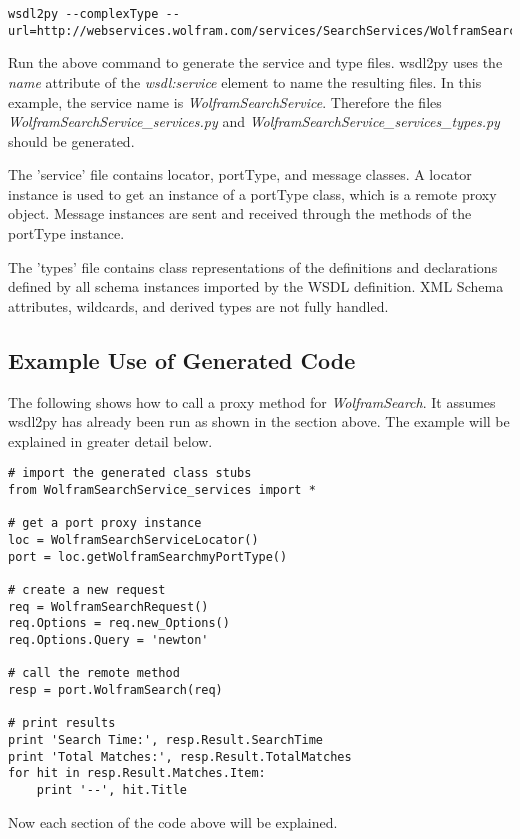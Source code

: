 \begin{verbatim}
wsdl2py --complexType --url=http://webservices.wolfram.com/services/SearchServices/WolframSearch2.wsdl
\end{verbatim}

Run the above command to generate the service and type files.  wsdl2py uses
the {\it name} attribute of the {\it wsdl:service} element to name the resulting files.
In this example, the service name is {\it WolframSearchService}.  Therefore the files
{\it WolframSearchService_services.py} and {\it WolframSearchService_services_types.py}
should be generated.

The 'service' file contains locator, portType, and message classes.  
A locator instance is used to get an instance of a portType class, 
which is a remote proxy object. Message instances are sent and received 
through the methods of the portType instance.

The 'types' file contains class representations of the definitions and
declarations defined by all schema instances imported by the WSDL definition.
XML Schema attributes, wildcards, and derived types are not fully
handled.

\subsection{Example Use of Generated Code}

The following shows how to call a proxy method for {\it WolframSearch}.  It
assumes wsdl2py has already been run as shown in the section above.  The example
will be explained in greater detail below.

\begin{verbatim}
# import the generated class stubs
from WolframSearchService_services import *

# get a port proxy instance
loc = WolframSearchServiceLocator()
port = loc.getWolframSearchmyPortType()

# create a new request
req = WolframSearchRequest()
req.Options = req.new_Options()
req.Options.Query = 'newton'

# call the remote method
resp = port.WolframSearch(req)

# print results
print 'Search Time:', resp.Result.SearchTime
print 'Total Matches:', resp.Result.TotalMatches
for hit in resp.Result.Matches.Item:
    print '--', hit.Title
\end{verbatim}

Now each section of the code above will be explained.

